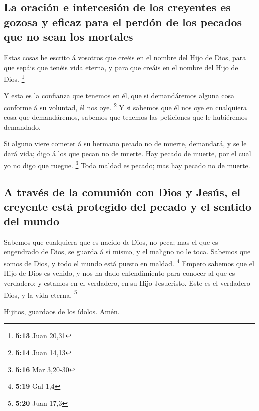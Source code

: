 \hypertarget{la-oraciuxf3n-e-intercesiuxf3n-de-los-creyentes-es-gozosa-y-eficaz-para-el-perduxf3n-de-los-pecados-que-no-sean-los-mortales}{%
\subsection{La oración e intercesión de los creyentes es gozosa y eficaz
para el perdón de los pecados que no sean los
mortales}\label{la-oraciuxf3n-e-intercesiuxf3n-de-los-creyentes-es-gozosa-y-eficaz-para-el-perduxf3n-de-los-pecados-que-no-sean-los-mortales}}

 Estas cosas he escrito á vosotros que creéis en el
nombre del Hijo de Dios, para que sepáis que tenéis vida eterna, y para
que creáis en el nombre del Hijo de Dios. \footnote{\textbf{5:13} Juan
  20,31}

 Y esta es la confianza que tenemos en él, que si
demandáremos alguna cosa conforme á su voluntad, él nos oye. \footnote{\textbf{5:14}
  Juan 14,13}  Y si sabemos que él nos oye en cualquiera
cosa que demandáremos, sabemos que tenemos las peticiones que le
hubiéremos demandado.

 Si alguno viere cometer á su hermano pecado no de
muerte, demandará, y se le dará vida; digo á los que pecan no de muerte.
Hay pecado de muerte, por el cual yo no digo que ruegue. \footnote{\textbf{5:16}
  Mar 3,20-30}  Toda maldad es pecado; mas hay pecado no
de muerte.

\hypertarget{a-travuxe9s-de-la-comuniuxf3n-con-dios-y-jesuxfas-el-creyente-estuxe1-protegido-del-pecado-y-el-sentido-del-mundo}{%
\subsection{A través de la comunión con Dios y Jesús, el creyente está
protegido del pecado y el sentido del
mundo}\label{a-travuxe9s-de-la-comuniuxf3n-con-dios-y-jesuxfas-el-creyente-estuxe1-protegido-del-pecado-y-el-sentido-del-mundo}}

 Sabemos que cualquiera que es nacido de Dios, no peca;
mas el que es engendrado de Dios, se guarda á sí mismo, y el maligno no
le toca.  Sabemos que somos de Dios, y todo el mundo está
puesto en maldad. \footnote{\textbf{5:19} Gal 1,4} 
Empero sabemos que el Hijo de Dios es venido, y nos ha dado
entendimiento para conocer al que es verdadero: y estamos en el
verdadero, en su Hijo Jesucristo. Este es el verdadero Dios, y la vida
eterna. \footnote{\textbf{5:20} Juan 17,3}

 Hijitos, guardaos de los ídolos. Amén.
